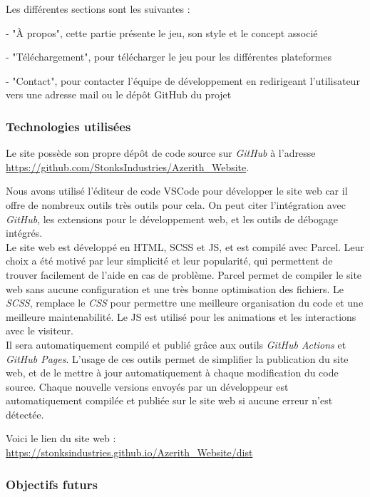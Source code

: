 Les différentes sections sont les suivantes :

- "À propos", cette partie présente le jeu, son style et le concept associé

- "Téléchargement", pour télécharger le jeu pour les différentes plateformes

- "Contact", pour contacter l'équipe de développement en redirigeant l'utilisateur vers une adresse mail ou le dépôt GitHub du projet


\subsubsection*{\hspace*{0.6cm}Technologies utilisées}

Le site possède son propre dépôt de code source sur \textit{GitHub} à l'adresse \url{https://github.com/StonksIndustries/Azerith_Website}. 

Nous avons utilisé l'éditeur de code VSCode pour développer le site web car il offre de nombreux outils très outils pour cela. On peut citer l'intégration avec \textit{GitHub}, les extensions pour le développement web, et les outils de débogage intégrés.
\\

Le site web est développé en HTML, SCSS et JS, et est compilé avec Parcel. 
Leur choix a été motivé par leur simplicité et leur popularité, qui permettent de trouver facilement de l'aide en cas de problème. 
Parcel permet de compiler le site web sans aucune configuration et une très bonne optimisation des fichiers. 
Le \textit{SCSS}, remplace le \textit{CSS} pour permettre une meilleure organisation du code et une meilleure maintenabilité. 
Le JS est utilisé pour les animations et les interactions avec le visiteur.
\\

Il sera automatiquement compilé et publié grâce aux outils \textit{GitHub Actions} et \textit{GitHub Pages}. 
L'usage de ces outils permet de simplifier la publication du site web, et de le mettre à jour automatiquement à chaque modification du code source. 
Chaque nouvelle versions envoyés par un développeur est automatiquement compilée et publiée sur le site web si aucune erreur n'est détectée.

Voici le lien du site web : \url{https://stonksindustries.github.io/Azerith_Website/dist}

\subsubsection*{\hspace*{0.6cm}Objectifs futurs}

